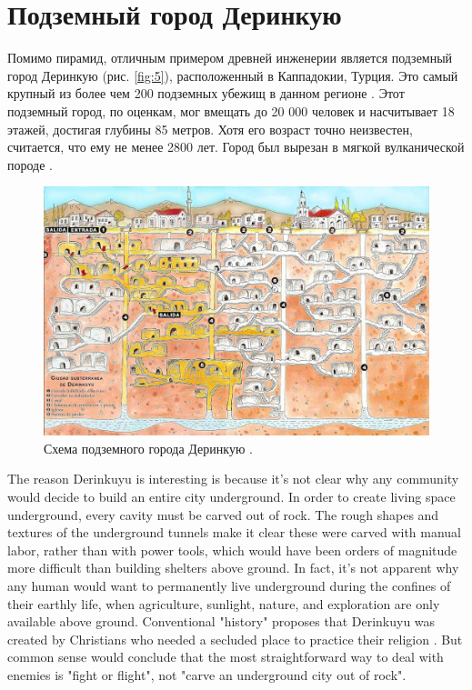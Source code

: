 \documentclass[10pt,twocolumn,letterpaper]{article}
\begin{document}
\section{Подземный город Деринкую}

Помимо пирамид, отличным примером древней инженерии является подземный город Деринкую (рис. \ref{fig:5}), расположенный в Каппадокии, Турция. Это самый крупный из более чем 200 подземных убежищ в данном регионе \cite{54}. Этот подземный город, по оценкам, мог вмещать до 20 000 человек и насчитывает 18 этажей, достигая глубины 85 метров. Хотя его возраст точно неизвестен, считается, что ему не менее 2800 лет. Город был вырезан в мягкой вулканической породе \cite{52, 53}.

\begin{figure}[b]
\begin{center}
   \includegraphics[width=1\linewidth]{derinkuyu.jpeg}
\end{center}
   \caption{Схема подземного города Деринкую \cite{56}.}
\label{fig:5}
\label{fig:onecol}
\end{figure}
The reason Derinkuyu is interesting is because it's not clear why any community would decide to build an entire city underground. In order to create living space underground, every cavity must be carved out of rock. The rough shapes and textures of the underground tunnels make it clear these were carved with manual labor, rather than with power tools, which would have been orders of magnitude more difficult than building shelters above ground. In fact, it's not apparent why any human would want to permanently live underground during the confines of their earthly life, when agriculture, sunlight, nature, and exploration are only available above ground. Conventional "history" proposes that Derinkuyu was created by Christians who needed a secluded place to practice their religion \cite{53}. But common sense would conclude that the most straightforward way to deal with enemies is "fight or flight", not "carve an underground city out of rock".
\end{document}

